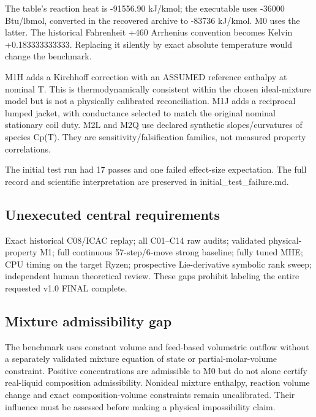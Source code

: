 \documentclass[
  11pt,
]{article}
\begin{document}
The table's reaction heat is -91556.90 kJ/kmol; the executable uses
-36000 Btu/lbmol, converted in the recovered archive to -83736 kJ/kmol.
M0 uses the latter. The historical Fahrenheit +460 Arrhenius convention
becomes Kelvin +0.183333333333. Replacing it silently by exact absolute
temperature would change the benchmark.

M1H adds a Kirchhoff correction with an ASSUMED reference enthalpy at
nominal T. This is thermodynamically consistent within the chosen
ideal-mixture model but is not a physically calibrated reconciliation.
M1J adds a reciprocal lumped jacket, with conductance selected to match
the original nominal stationary coil duty. M2L and M2Q use declared
synthetic slopes/curvatures of species Cp(T). They are
sensitivity/falsification families, not measured property correlations.

The initial test run had 17 passes and one failed effect-size
expectation. The full record and scientific interpretation are preserved
in initial\_test\_failure.md.

\hypertarget{unexecuted-central-requirements}{%
\subsection{Unexecuted central
requirements}\label{unexecuted-central-requirements}}

Exact historical C08/ICAC replay; all C01--C14 raw audits; validated
physical-property M1; full continuous 57-step/6-move strong baseline;
fully tuned MHE; CPU timing on the target Ryzen; prospective
Lie-derivative symbolic rank sweep; independent human theoretical
review. These gaps prohibit labeling the entire requested v1.0 FINAL
complete.

\hypertarget{mixture-admissibility-gap}{%
\subsection{Mixture admissibility gap}\label{mixture-admissibility-gap}}

The benchmark uses constant volume and feed-based volumetric outflow
without a separately validated mixture equation of state or
partial-molar-volume constraint. Positive concentrations are admissible
to M0 but do not alone certify real-liquid composition admissibility.
Nonideal mixture enthalpy, reaction volume change and exact
composition-volume constraints remain uncalibrated. Their influence must
be assessed before making a physical impossibility claim.
\end{document}
